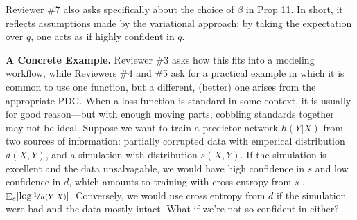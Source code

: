 \documentclass{article}
\theoremstyle{plain}
\theoremstyle{definition}
\DeclareMathOperator*{\Ex}{\mathbb{E}} %
\newcommand\revc[1]{{\color{revcolor}#1}}
\begin{document}

\revc{Reviewer \#7} also asks specifically about the choice of $\beta$ in Prop 11.
In short, it reflects assumptions made by the variational approach: by taking the expectation over $q$, one acts as if highly confident in $q$.

\textbf{A Concrete Example.}
\revc{Reviewer \#3} asks how this fits into a modeling workflow, while
\revc{Reviewers \#4 and \#5} ask for a practical example in which it is common to use one function, but a different, (better) one arises from the appropriate PDG.
When a loss function is standard in some context, it is usually for good reason---but with enough moving parts, cobbling standards together may not be ideal.
Suppose we want to train a predictor network $h(Y|X)$ from two sources of information: partially corrupted data with emperical distribution $d(X,Y)$, and a simulation with distribution $s(X,Y)$.
If the simulation is excellent and the data unsalvagable, we would have high confidence in $s$ and low confidence in $d$, which amounts to training with cross entropy from $s$%
, $\Ex_s [\log \nf1{h(Y|X)}]$.
Conversely, we would use cross entropy from $d$ if the simulation were bad and the data mostly intact.
What if we're not so confident in either?
\end{document}

